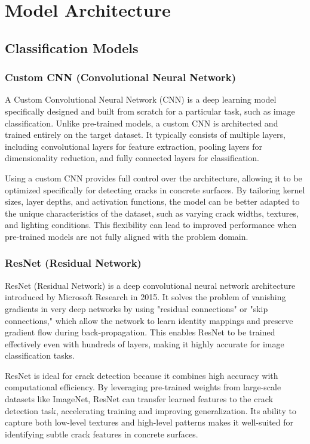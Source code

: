 \chapter{Model Architecture}

\section{Classification Models}

\subsection{Custom CNN (Convolutional Neural Network)}

A Custom Convolutional Neural Network (CNN) is a deep learning model specifically designed and built from scratch for a particular task, such as image classification. Unlike pre-trained models, a custom CNN is architected and trained entirely on the target dataset. It typically consists of multiple layers, including convolutional layers for feature extraction, pooling layers for dimensionality reduction, and fully connected layers for classification.

Using a custom CNN provides full control over the architecture, allowing it to be optimized specifically for detecting cracks in concrete surfaces. By tailoring kernel sizes, layer depths, and activation functions, the model can be better adapted to the unique characteristics of the dataset, such as varying crack widths, textures, and lighting conditions. This flexibility can lead to improved performance when pre-trained models are not fully aligned with the problem domain.

\subsection{ResNet (Residual Network)}

ResNet (Residual Network) is a deep convolutional neural network architecture introduced by Microsoft Research in 2015. It solves the problem of vanishing gradients in very deep networks by using "residual connections" or "skip connections," which allow the network to learn identity mappings and preserve gradient flow during back-propagation. This enables ResNet to be trained effectively even with hundreds of layers, making it highly accurate for image classification tasks.\cite{He2015DeepRL}

ResNet is ideal for crack detection because it combines high accuracy with computational efficiency. By leveraging pre-trained weights from large-scale datasets like ImageNet, ResNet can transfer learned features to the crack detection task, accelerating training and improving generalization. Its ability to capture both low-level textures and high-level patterns makes it well-suited for identifying subtle crack features in concrete surfaces.

